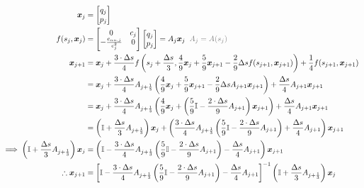 \documentclass{article}
\begin{document}
\begin{align*}
	\bm{x}_j                                                                       & =\begin{bmatrix} q_{j} \\ p_{j} \end{bmatrix}                                                                                                                                                                                                \\
	f(s_{j}, \bm{x}_j)                                                             & = \begin{bmatrix} 0 & c_{j} \\ -\frac{c_{nn, j}}{c_j^2} & 0\end{bmatrix}\begin{bmatrix}q_j \\ p_j\end{bmatrix} = A_j\bm{x}_j\textcolor{gray}{\;\;A_j=A(s_j)}                                                           \\
	\bm{x}_{j+1}                                                                   & = \bm{x}_j + \frac{3\cdot \Delta s}{4}f\left(s_{j}+\frac{\Delta s}{3}, \frac{4}{9}\bm{x}_j+\frac{5}{9}\bm{x}_{j+1}-\frac{2}{9}\Delta s f(s_{j+1}, \bm{x}_{j+1})\right) + \frac{1}{4}f(s_{j+1}, \bm{x}_{j+1})                                 \\
	                                                                               & =\bm{x}_j + \frac{3\cdot\Delta s}{4}A_{j+\frac{1}{3}}\left(\frac{4}{9}\bm{x}_j + \frac{5}{9}\bm{x}_{j+1}-\frac{2}{9}\Delta sA_{j+1}\bm{x}_{j+1}\right) + \frac{\Delta s}{4}A_{j+1}\bm{x}_{j+1}                                               \\
	                                                                               & = \bm{x}_j + \frac{3\cdot\Delta s}{4}A_{j+\frac{1}{3}}\left(\frac{4}{9}\bm{x}_j + \left(\frac{5}{9}\mathbb{I}-\frac{2\cdot\Delta s}{9}A_{j+1}\right)\bm{x}_{j+1} \right) + \frac{\Delta s}{4}A_{j+1}\bm{x}_{j+1}                             \\
	                                                                               & = \left(\mathbb{I} + \frac{\Delta s}{3}A_{j+\frac{1}{3}}\right)\bm{x}_j + \left(\frac{3\cdot\Delta s}{4}A_{j+\frac{1}{3}}\left(\frac{5}{9}\mathbb{I}-\frac{2\cdot\Delta s}{9}A_{j+1}\right)+\frac{\Delta s}{4}A_{j+1}\right)\bm{x}_{j+1}     \\
	\implies \left(\mathbb{I} + \frac{\Delta s}{3}A_{j+\frac{1}{3}}\right)\bm{x}_j & =\left(\mathbb{I} - \frac{3\cdot\Delta s}{4}A_{j+\frac{1}{3}}\left(\frac{5}{9}\mathbb{I}-\frac{2\cdot\Delta s}{9}A_{j+1}\right)- \frac{\Delta s}{4}A_{j+1}\right)\bm{x}_{j+1}                                                                \\
	\therefore \bm{x}_{j+1}                                                        & = \left[\mathbb{I} - \frac{3\cdot\Delta s}{4}A_{j+\frac{1}{3}}\left(\frac{5}{9}\mathbb{I}-\frac{2\cdot\Delta s}{9}A_{j+1}\right)- \frac{\Delta s}{4}A_{j+1}\right]^{-1}\left(\mathbb{I} + \frac{\Delta s}{3}A_{j+\frac{1}{3}}\right)\bm{x}_j
\end{align*}
\end{document}
